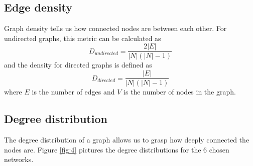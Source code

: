 \subsection{Edge density}
Graph density tells us how connected nodes are between each other. For undirected graphs, this metric can be calculated as
\begin{equation}
    D_{undirected} = \frac{2|E|}{|N|(|N|-1)}
    \label{equation:dir_density}
\end{equation}
and the density for directed graphs is defined as
\begin{equation}
    D_{directed} = \frac{|E|}{|N|(|N    |-1)}
    \label{equation:undir_density}
\end{equation}
where $E$ is the number of edges and $V$ is the number of nodes in the graph.

\subsection{Degree distribution}
The degree distribution of a graph allows us to grasp how deeply connected the nodes are. Figure \ref{fig:4} pictures the degree distributions for the 6 chosen networks.
